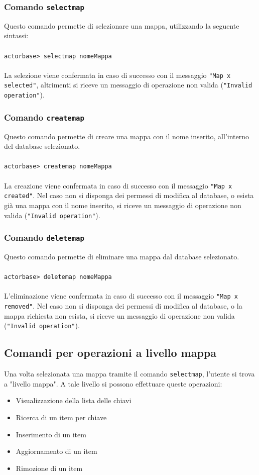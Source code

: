 \documentclass[a4paper]{article}
\begin{document}
	\subsubsection{Comando \texttt{selectmap}}
	Questo comando permette di selezionare una mappa, utilizzando la seguente sintassi:
	\\ \\
	\texttt{actorbase>	selectmap nomeMappa}
	\\ \\
	La selezione viene confermata in caso di successo con il messaggio \texttt{"Map x selected"}, altrimenti si riceve un messaggio di operazione non valida (\texttt{"Invalid operation"}).

	\subsubsection{Comando \texttt{createmap}}
	Questo comando permette di creare una mappa con il nome inserito, all'interno del database selezionato.
	\\ \\
	\texttt{actorbase>	createmap nomeMappa}
	\\ \\
	La creazione viene confermata in caso di successo con il messaggio \texttt{"Map x created"}. Nel caso non si disponga dei permessi di modifica al database, o esista già una mappa con il nome inserito, si riceve un messaggio di operazione non valida (\texttt{"Invalid operation"}).

	\subsubsection{Comando \texttt{deletemap}}
	Questo comando permette di eliminare una mappa dal database selezionato. 
	\\ \\
	\texttt{actorbase>	deletemap nomeMappa}
	\\ \\
	L'eliminazione viene confermata in caso di successo con il messaggio \texttt{"Map x removed"}. Nel caso non si disponga dei permessi di modifica al database, o la mappa richiesta non esista, si riceve un messaggio di operazione non valida (\texttt{"Invalid operation"}).
	

	\subsection{Comandi per operazioni a livello mappa}
	Una volta selezionata una mappa tramite il comando \texttt{selectmap}, l'utente si trova a "livello mappa". A tale livello si possono effettuare queste operazioni:
	\begin{itemize}
		\item Visualizzazione della lista delle chiavi
		\item Ricerca di un item per chiave
		\item Inserimento di un item 
		\item Aggiornamento di un item
		\item Rimozione di un item
	\end{itemize}
\end{document}
